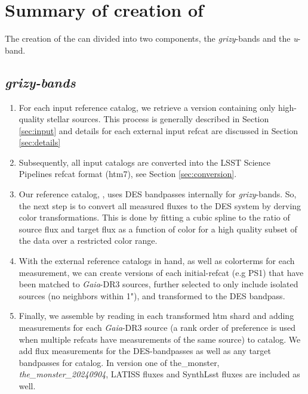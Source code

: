 \section{Summary of creation of \monster}
\label{sec:summary}
The creation of the \monster can divided into two components, the \textit{grizy}-bands and the \textit{u}-band.


\subsection{\textit{grizy-bands}}
\begin{enumerate}
    \item For each input reference catalog, we retrieve a version containing only high-quality stellar sources. This process is generally described in Section \ref{sec:input} and details for each external input refcat are discussed in Section \ref{sec:details}
    \item Subsequently, all input catalogs are converted into the LSST Science Pipelines refcat format (htm7), see Section \ref{sec:conversion}.
    \item Our reference catalog, \monster, uses DES bandpasses internally for \textit{grizy}-bands. So, the next step is to convert all measured fluxes to the DES system by derving color transformations.
    This is done by fitting a cubic spline to the ratio of source flux and target flux as a function of color for a high quality subset of the data over a restricted color range.
    \item With the external reference catalogs in hand, as well as colorterms for each measurement, we can create versions of each initial-refcat (e.g PS1) that have been matched to \textit{Gaia}-DR3 sources, further selected to only include isolated sources (no neighbors within 1"), and transformed to the DES bandpass.
    \item Finally, we assemble \monster by reading in each transformed htm shard and adding measurements for each \emph{Gaia}-DR3 source (a rank order of preference is used when multiple refcats have measurements of the same source) to \monster catalog. 
    We add flux measurements for the DES-bandpasses as well as any target bandpasses for \monster catalog. In version one of the\_monster, \textit{the\_monster\_20240904}, LATISS fluxes and SynthLsst fluxes are included as well.
\end{enumerate}

